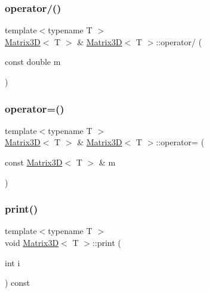 \mbox{\label{classMatrix3D_ad45bff7f2159a4ba0aa4546635e8a73f_ad45bff7f2159a4ba0aa4546635e8a73f}} 
\subsubsection{\texorpdfstring{operator/()}{operator/()}}
{\footnotesize\ttfamily template$<$typename T $>$ \\
\mbox{\hyperlink{classMatrix3D}{Matrix3D}}$<$ T $>$ \& \mbox{\hyperlink{classMatrix3D}{Matrix3D}}$<$ T $>$\+::operator/ (\begin{DoxyParamCaption}\item[{const double}]{m }\end{DoxyParamCaption})}

\mbox{\label{classMatrix3D_a0e84724f089ae3478283ea81d0b866af_a0e84724f089ae3478283ea81d0b866af}} 
\subsubsection{\texorpdfstring{operator=()}{operator=()}}
{\footnotesize\ttfamily template$<$typename T $>$ \\
\mbox{\hyperlink{classMatrix3D}{Matrix3D}}$<$ T $>$ \& \mbox{\hyperlink{classMatrix3D}{Matrix3D}}$<$ T $>$\+::operator= (\begin{DoxyParamCaption}\item[{const \mbox{\hyperlink{classMatrix3D}{Matrix3D}}$<$ T $>$ \&}]{m }\end{DoxyParamCaption})}

\mbox{\label{classMatrix3D_abc1d3451a2fb3cce0bec1d1e33097b1e_abc1d3451a2fb3cce0bec1d1e33097b1e}} 
\subsubsection{\texorpdfstring{print()}{print()}}
{\footnotesize\ttfamily template$<$typename T $>$ \\
void \mbox{\hyperlink{classMatrix3D}{Matrix3D}}$<$ T $>$\+::print (\begin{DoxyParamCaption}\item[{int}]{i }\end{DoxyParamCaption}) const}


